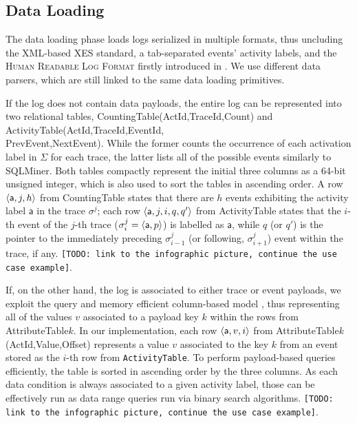 \subsection{Data Loading}\label{ssec:dl}
The data loading phase   loads logs  serialized in multiple  formats, thus uncluding the XML-based XES standard, a tab-separated events' activity labels, and the \textsc{Human Readable Log Format} firstly introduced in \cite{bpm21}. We use different data parsers, which are still linked to the same data loading primitives. 

If the log does not contain data payloads, the entire log can be represented into two relational tables, \textsf{CountingTable(ActId,TraceId,Count)} and \textsf{ActivityTable(ActId,TraceId,EventId,\\PrevEvent,NextEvent)}. While the former counts the occurrence of each activation label in $\Sigma$ for each trace, the latter lists all of the possible events similarly to SQLMiner. Both tables compactly represent the initial three columns as a 64-bit unsigned integer, which is also used to sort the tables in ascending order. A row $\braket{\textsf{a},j,h}$ from \textsf{CountingTable} states that there are $h$ events exhibiting the activity label $\textsf{a}$ in the trace $\sigma^j$; each row $\braket{\textsf{a},j,i,q,q'}$ from \textsf{ActivityTable} states that the $i$-th event of the $j$-th trace ($\sigma^j_i=\braket{\textsf{a},p}$) is labelled as $\textsf{a}$, while $q$ (or $q'$) is the pointer to the immediately preceding $\sigma^j_{i-1}$ (or  following, $\sigma^j_{i+1}$) event within the trace, if any.  \texttt{\color{red}[TODO: link to the infographic picture, continue the use case example]}. 

If, on the other hand, the log is associated to either trace or event payloads, we exploit 
the query and memory efficient  column-based model \cite{IdreosGNMMK12}, thus representing all of the values $v$ associated to a  payload key $k$ within the rows from  \textsf{AttributeTable$k$}. In our implementation, each row $\braket{\textsf{a},v,i}$ from  \textsf{AttributeTable$k$(ActId,Value,Offset)} represents a value $v$ associated to the key $k$ from an event stored as the $i$-th row from \texttt{ActivityTable}. To perform payload-based queries efficiently, the table is sorted in ascending order by the  three columns. As each data condition is always associated to a given activity label, those can be effectively run as data range queries run via binary search algorithms. \texttt{\color{red}[TODO: link to the infographic picture, continue the use case example]}. 


